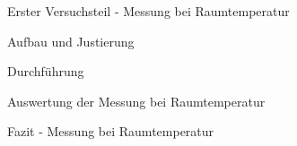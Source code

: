 \documentclass[pdftex, a4paper,11pt, twoside, ngerman]{report}
\begin{document}
  \begin{chapter}{Erster Versuchsteil - Messung bei Raumtemperatur}
    \label{chp:Raumtemperatur}
   
   
   
    \begin{section}{Aufbau und Justierung}
      \label{chp:RaumtemperaturAufbauJustierung}
      
      
      
    \end{section}
   
   
   
    \begin{section}{Durchführung}
      \label{chp:RaumtemperaturDurchfuehrung}
      
      
      
    \end{section}
   
   
   
    \begin{section}{Auswertung der Messung bei Raumtemperatur}
      \label{chp:RaumtemperaturAuswertung}
      
      
      
    \end{section}
   
   
   
    \begin{section}{Fazit - Messung bei Raumtemperatur}
      \label{chp:RaumtemperaturFazit}
      
      
      
    \end{section}
   
  \end{chapter}
 
 
 
\end{document}
